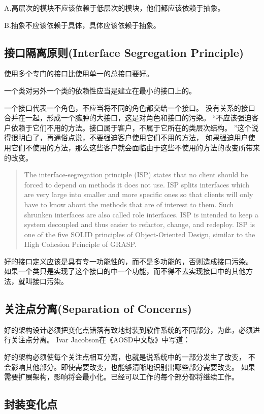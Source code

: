 \documentclass{book}
\begin{document}
A.高层次的模块不应该依赖于低层次的模块，他们都应该依赖于抽象。

B.抽象不应该依赖于具体，具体应该依赖于抽象。

\subsection{接口隔离原则(Interface Segregation Principle)}

使用多个专门的接口比使用单一的总接口要好。

一个类对另外一个类的依赖性应当是建立在最小的接口上的。

一个接口代表一个角色，不应当将不同的角色都交给一个接口。
没有关系的接口合并在一起，形成一个臃肿的大接口，这是对角色和接口的污染。
“不应该强迫客户依赖于它们不用的方法。接口属于客户，不属于它所在的类层次结构。
”这个说得很明白了，再通俗点说，不要强迫客户使用它们不用的方法，
如果强迫用户使用它们不使用的方法，那么这些客户就会面临由于这些不使用的方法的改变所带来的改变。

\begin{quotation}
The interface-segregation principle (ISP) states that no client should be forced to 
depend on methods it does not use. 
ISP splits interfaces which are very large into smaller and more specific ones 
so that clients will only have to know about the methods that are of interest to them. 
Such shrunken interfaces are also called role interfaces. 
ISP is intended to keep a system decoupled and thus easier to refactor, 
change, and redeploy. ISP is one of the five SOLID principles of Object-Oriented Design,
 similar to the High Cohesion Principle of GRASP.
\end{quotation}

好的接口定义应该是具有专一功能性的，而不是多功能的，否则造成接口污染。
如果一个类只是实现了这个接口的中一个功能，而不得不去实现接口中的其他方法，就叫接口污染。

\subsection{关注点分离(Separation of Concerns)}

好的架构设计必须把变化点错落有致地封装到软件系统的不同部分，为此，必须进行关注点分离。
Ivar Jacobson在《AOSD中文版》中写道：

好的架构必须使每个关注点相互分离，也就是说系统中的一部分发生了改变，
不会影响其他部分。即使需要改变，也能够清晰地识别出哪些部分需要改变。
如果需要扩展架构，影响将会最小化。已经可以工作的每个部分都将继续工作。\subsection{封装变化点}
\end{document}
